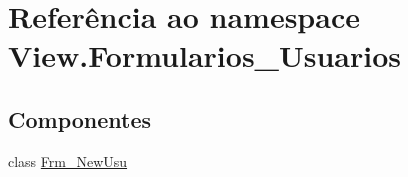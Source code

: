 \hypertarget{namespace_view_1_1_formularios___usuarios}{}\section{Referência ao namespace View.\+Formularios\+\_\+\+Usuarios}
\label{namespace_view_1_1_formularios___usuarios}
\subsection*{Componentes}
\begin{DoxyCompactItemize}
\item 
class \hyperlink{class_view_1_1_formularios___usuarios_1_1_frm___new_usu}{Frm\+\_\+\+New\+Usu}
\end{DoxyCompactItemize}
